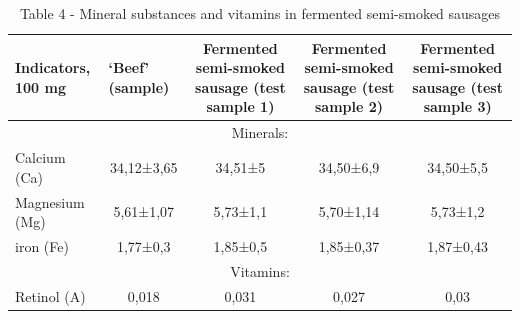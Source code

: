 \begin{table}[H]
\caption*{Table 4 - Mineral substances and vitamins in fermented semi-smoked sausages}
\centering
\begin{tabular}{|lcccc|}
\hline
\multicolumn{1}{|l|}{Indicators, 100 mg}      & \multicolumn{1}{l|}{‘Beef’ (sample)} & \multicolumn{1}{p{0.15\textwidth}|}{Fermented semi-smoked sausage (test sample 1)} & \multicolumn{1}{p{0.15\textwidth}|}{Fermented semi-smoked sausage (test sample 2)} & \multicolumn{1}{p{0.15\textwidth}|}{Fermented semi-smoked sausage (test sample 3)} \\ \hline
\multicolumn{5}{|c|}{Minerals:}                                                                                                                                                                                                                                                                     \\ \hline
\multicolumn{1}{|l|}{Calcium (Ca)}            & \multicolumn{1}{c|}{34,12±3,65}      & \multicolumn{1}{c|}{34,51±5}                                       & \multicolumn{1}{c|}{34,50±6,9}                                     & 34,50±5,5                                                          \\ \hline
\multicolumn{1}{|l|}{Magnesium (Mg)}          & \multicolumn{1}{c|}{5,61±1,07}       & \multicolumn{1}{c|}{5,73±1,1}                                      & \multicolumn{1}{c|}{5,70±1,14}                                     & 5,73±1,2                                                           \\ \hline
\multicolumn{1}{|l|}{iron (Fe)}               & \multicolumn{1}{c|}{1,77±0,3}        & \multicolumn{1}{c|}{1,85±0,5}                                      & \multicolumn{1}{c|}{1,85±0,37}                                     & 1,87±0,43                                                          \\ \hline
\multicolumn{5}{|c|}{Vitamins:}                                                                                                                                                                                                                                                                     \\ \hline
\multicolumn{1}{|l|}{Retinol (A)}             & \multicolumn{1}{c|}{0,018}           & \multicolumn{1}{c|}{0,031}                                         & \multicolumn{1}{c|}{0,027}                                         & 0,03                                                               \\ \hline

\end{tabular}
\end{table}
